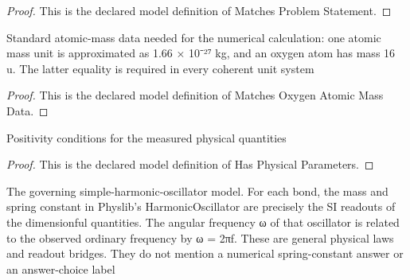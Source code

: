 \begin{proof}
  This is the declared model definition of Matches Problem Statement.
\end{proof}
\begin{definition}
  \label{def:physics:phyx-mini-0207:phyxminiproblems-problemphyxmini0207-matchesoxygenatomicmassdata}
  Standard atomic-mass data needed for the numerical calculation: one atomic mass unit is approximated as 1.66 × 10⁻²⁷ kg, and an oxygen atom has mass 16 u. The latter equality is required in every coherent unit system
\end{definition}
\begin{proof}
  This is the declared model definition of Matches Oxygen Atomic Mass Data.
\end{proof}
\begin{definition}
  \label{def:physics:phyx-mini-0207:phyxminiproblems-problemphyxmini0207-hasphysicalparameters}
  Positivity conditions for the measured physical quantities
\end{definition}
\begin{proof}
  This is the declared model definition of Has Physical Parameters.
\end{proof}
\begin{definition}
  \label{def:physics:phyx-mini-0207:phyxminiproblems-problemphyxmini0207-satisfiesindependentoxygenoscillatormodel}
  The governing simple-harmonic-oscillator model. For each bond, the mass and spring constant in Physlib's HarmonicOscillator are precisely the SI readouts of the dimensionful quantities. The angular frequency ω of that oscillator is related to the observed ordinary frequency by ω = 2πf. These are general physical laws and readout bridges. They do not mention a numerical spring-constant answer or an answer-choice label
\end{definition}
